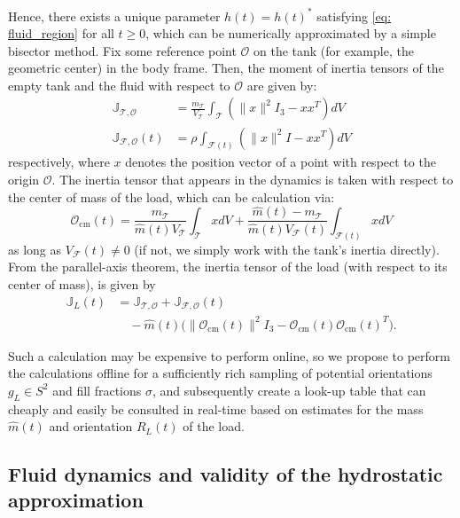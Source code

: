 \documentclass[letterpaper, 10 pt, conference]{ieeeconf}  %
\newcommand{\J}{\mathbb{J}}
\begin{document}
Hence, there exists a unique parameter $h(t)  = h(t)^\ast$ satisfying \eqref{eq: fluid_region} for all $t \ge 0$, which can be numerically approximated by a simple bisector method. Fix some reference point $\mathcal{O}$ on the tank (for example, the geometric center) in the body frame. Then, the moment of inertia tensors of the empty tank and the fluid with respect to $\mathcal{O}$ are given by: 
\begin{align*}
    \J_{\mathcal{T}, \mathcal{O}} &= \frac{m_{\mathcal{T}}}{V_{\mathcal{T}}} \int_{\mathcal{T}} (\|x\|^2 I_3 - xx^T)dV \\
    \J_{\mathcal{F}, \mathcal{O}}(t) &= \rho \int_{\mathcal{F}(t)} (\|x\|^2 I - xx^T)dV
\end{align*}
respectively, where $x$ denotes the position vector of a point with respect to the origin $\mathcal{O}$. The inertia tensor that appears in the dynamics is taken with respect to the center of mass of the load, which can be calculation via:
$$\mathcal{O}_{\text{cm}}(t) = \frac{m_{\mathcal{T}}}{\hat{m}(t)V_{\mathcal{T}}} \int_{\mathcal{T}} xdV + \frac{\hat{m}(t) - m_{\mathcal{T}}}{\hat{m}(t)V_{\mathcal{F}}(t)} \int_{\mathcal{F}(t)} xdV$$
as long as $V_{\mathcal{F}}(t) \ne 0$ (if not, we simply work with the tank's inertia directly).
From the parallel-axis theorem, the inertia tensor of the load (with respect to its center of mass), is given by
\begin{equation*}
\begin{aligned}
\J_L(t) &= \J_{\mathcal{T}, \mathcal{O}} + \J_{\mathcal{F}, \mathcal{O}}(t) \\
&\quad - \hat{m}(t)\Big(\|\mathcal{O}_{\mathrm{cm}}(t)\|^2 I_3
- \mathcal{O}_{\mathrm{cm}}(t)\mathcal{O}_{\mathrm{cm}}(t)^T\Big).
\end{aligned}
\end{equation*}

Such a calculation may be expensive to perform online, so we propose to perform the calculations offline for a sufficiently rich sampling of potential orientations $g_L \in S^2$ and fill fractions $\sigma$, and subsequently create a look-up table that can cheaply and easily be consulted in real-time based on estimates for the mass $\hat{m}(t)$ and orientation $R_L(t)$ of the load.

\subsection*{Fluid dynamics and validity of the hydrostatic approximation}
\end{document}
